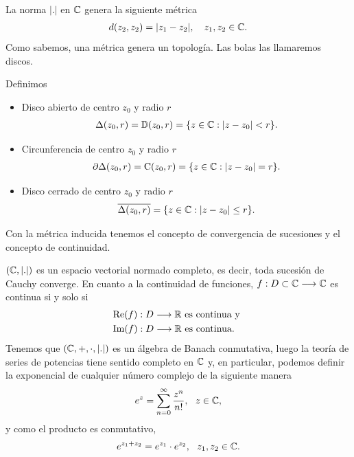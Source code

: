 La norma $|.|$ en $\mathbb{C}$ genera la siguiente métrica
\begin{align*}
    d(z_2,z_2) = |z_1 - z_2|, \ \ \ z_1,z_2 \in \mathbb{C}.
\end{align*}
Como sabemos, una métrica genera un topología. Las bolas las llamaremos discos.
\begin{defi}
    Definimos
    \begin{itemize}
        \item Disco abierto de centro $z_0$ y radio $r$
              \begin{align*}
                  \Delta(z_0,r) = \mathbb{D}(z_0,r) = \{z \in \mathbb{C} : |z - z_0| < r \}.
              \end{align*}
        \item Circunferencia de centro $z_0$ y radio $r$
              \begin{align*}
                  \partial \Delta(z_0,r) = \text{C}(z_0,r) = \{z \in \mathbb{C} : |z - z_0| =  r \}.
              \end{align*}
        \item Disco cerrado de centro $z_0$ y radio $r$
              \begin{align*}
                  \overline{\Delta(z_0,r)} = \{z \in \mathbb{C} : |z - z_0| \leq r \}.
              \end{align*}
    \end{itemize}
\end{defi}
Con la métrica inducida tenemos el concepto de convergencia de sucesiones y el concepto de continuidad.
\begin{obs}
    $(\mathbb{C}, |.|)$ es un espacio vectorial normado completo, es decir, toda sucesión de Cauchy converge. En cuanto a la continuidad de funciones, $f: D \subset \mathbb{C} \longrightarrow \mathbb{C}$ es continua si y solo si
    \begin{align*}
         & \text{Re}(f) : D \longrightarrow \mathbb{R} \text{ es continua y } \\
         & \text{Im}(f) : D \longrightarrow \mathbb{R} \text{ es continua}.
    \end{align*}
    Tenemos que $(\mathbb{C}, +, \cdot, |.|)$ es un álgebra de Banach conmutativa, luego la teoría de series de potencias tiene sentido completo en $\mathbb{C}$ y, en particular, podemos definir la exponencial de cualquier número complejo de la siguiente manera
    \begin{align*}
        e^z = \sum_{n=0}^{\infty}{\frac{z^n}{n!}}, \ \ z \in \mathbb{C},
    \end{align*}
    y como el producto es conmutativo,
    \begin{align*}
        e^{z_1 + z_2} = e^{z_1} \cdot e^{z_2}, \ \ z_1,z_2 \in \mathbb{C}.
    \end{align*}
\end{obs}
